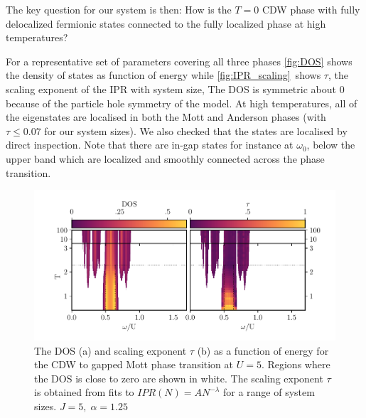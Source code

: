 The key question for our system is then: How is the \(T=0\) CDW phase with fully delocalized fermionic states connected to the fully localized phase at high temperatures?

For a representative set of parameters covering all three phases \cref{fig:DOS} shows the density of states as function of energy while \cref{fig:IPR_scaling}~shows \(\tau\), the scaling exponent of the IPR with system size, The DOS is symmetric about \(0\) because of the particle hole symmetry of the model. At high temperatures, all of the eigenstates are localised in both the Mott and Anderson phases (with \(\tau \leq 0.07\) for our system sizes). We also checked that the states are localised by direct inspection. Note that there are in-gap states for instance at \(\omega_0\), below the upper band which are localized and smoothly connected across the phase transition.

\hypertarget{fig:gap_opening_U5}{%
\begin{figure}
\centering
\includegraphics[width=1\textwidth,height=\textheight]{figure_code/fk_chapter/gap_opening/gap_opening_U5}
\caption[{The transition from CDW to the Mott phase}]{The DOS (a) and scaling exponent \(\tau\) (b) as a function of energy for the CDW to gapped Mott phase transition at \(U=5\). Regions where the DOS is close to zero are shown in white. The scaling exponent \(\tau\) is obtained from fits to \(IPR(N) = A N^{-\lambda}\) for a range of system sizes. \(J = 5,\;\alpha = 1.25\)}
\label{fig:gap_opening_U5}
\end{figure}
}

